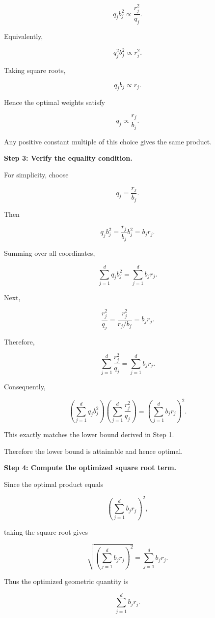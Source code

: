 \documentclass[11pt]{article}
\begin{document}
\begin{enumerate}
\begin{solutionbox}
\[
q_j b_j^2
\propto
\frac{r_j^2}{q_j}.
\]

Equivalently,

\[
q_j^2 b_j^2
\propto
r_j^2.
\]

Taking square roots,

\[
q_j b_j
\propto
r_j.
\]

Hence the optimal weights satisfy

\[
\boxed{
q_j
\propto
\frac{r_j}{b_j}.
}
\]

Any positive constant multiple of this choice gives the same product.

\medskip

\textbf{Step 3: Verify the equality condition.}

For simplicity, choose

\[
q_j
=
\frac{r_j}{b_j}.
\]

Then

\[
q_j b_j^2
=
\frac{r_j}{b_j}b_j^2
=
b_jr_j.
\]

Summing over all coordinates,

\[
\sum_{j=1}^{d}
q_j b_j^2
=
\sum_{j=1}^{d}
b_jr_j.
\]

Next,

\[
\frac{r_j^2}{q_j}
=
\frac{r_j^2}{r_j/b_j}
=
b_jr_j.
\]

Therefore,

\[
\sum_{j=1}^{d}
\frac{r_j^2}{q_j}
=
\sum_{j=1}^{d}
b_jr_j.
\]

Consequently,

\[
\left(
\sum_{j=1}^{d}
q_j b_j^2
\right)
\left(
\sum_{j=1}^{d}
\frac{r_j^2}{q_j}
\right)
=
\left(
\sum_{j=1}^{d}
b_jr_j
\right)^2.
\]

This exactly matches the lower bound derived in Step 1.

Therefore the lower bound is attainable and hence optimal.

\medskip

\textbf{Step 4: Compute the optimized square root term.}

Since the optimal product equals

\[
\left(
\sum_{j=1}^{d}
b_jr_j
\right)^2,
\]

taking the square root gives

\[
\sqrt{
\left(
\sum_{j=1}^{d}
b_jr_j
\right)^2
}
=
\sum_{j=1}^{d}
b_jr_j.
\]

Thus the optimized geometric quantity is

\[
\boxed{
\sum_{j=1}^{d}
b_jr_j.
}
\]

\medskip


\end{solutionbox}
\end{enumerate}
\end{document}
